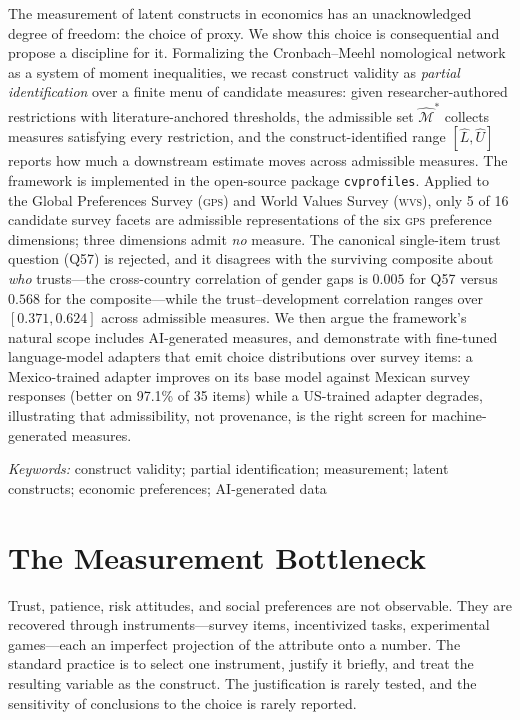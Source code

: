 \documentclass[11pt,letterpaper]{article}
\newcommand{\GPS}{\textsc{gps}}
\newcommand{\WVS}{\textsc{wvs}}
\newcommand{\cvp}{\texttt{cvprofiles}}
\newcommand{\Mstar}{\widehat{\mathcal{M}}^{*}}
\begin{document}
\noindent
The measurement of latent constructs in economics has an unacknowledged degree of freedom: the choice of
proxy. We show this choice is consequential and propose a discipline for it. Formalizing the
Cronbach--Meehl nomological network \cite{cronbach1955} as a system of moment inequalities, we recast
construct validity as \emph{partial identification} \cite{manski2003} over a finite menu of candidate
measures: given researcher-authored restrictions with literature-anchored thresholds, the admissible set
$\Mstar$ collects measures satisfying every restriction, and the construct-identified range $[\widehat L,
\widehat U]$ reports how much a downstream estimate moves across admissible measures. The framework is
implemented in the open-source package \cvp{}. Applied to the Global Preferences Survey (\GPS{}) and World
Values Survey (\WVS{}), only 5 of 16 candidate survey facets are admissible representations of the six \GPS{}
preference dimensions; three dimensions admit \emph{no} measure. The canonical single-item trust question
(Q57) is rejected, and it disagrees with the surviving composite about \emph{who} trusts---the cross-country
correlation of gender gaps is $0.005$ for Q57 versus $0.568$ for the composite---while the trust--development
correlation ranges over $[0.371, 0.624]$ across admissible measures. We then argue the framework's natural
scope includes AI-generated measures, and demonstrate with fine-tuned language-model adapters that emit
choice distributions over survey items: a Mexico-trained adapter improves on its base model against Mexican
survey responses (better on 97.1\% of 35 items) while a US-trained adapter degrades, illustrating that
admissibility, not provenance, is the right screen for machine-generated measures.

\vspace{0.3em}
\noindent\textit{Keywords:} construct validity; partial identification; measurement; latent constructs;
economic preferences; AI-generated data

\section{The Measurement Bottleneck}

Trust, patience, risk attitudes, and social preferences are not observable. They are recovered through
instruments---survey items, incentivized tasks, experimental games---each an imperfect projection of the
attribute onto a number. The standard practice is to select one instrument, justify it briefly, and treat the
resulting variable as the construct. The justification is rarely tested, and the sensitivity of conclusions to
the choice is rarely reported.
\end{document}
